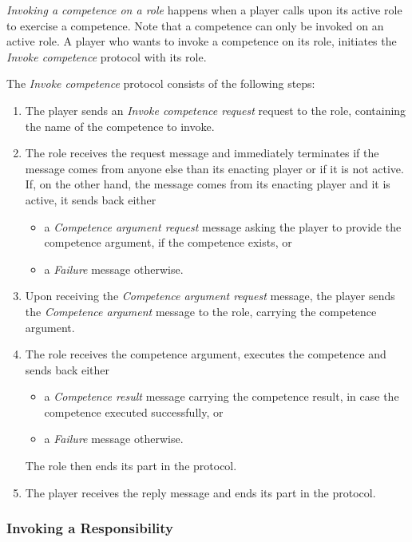 \textit{Invoking a competence on a role} happens when a player calls upon its active role to exercise a competence.
Note that a competence can only be invoked on an active role.
A player who wants to invoke a competence on its role, initiates the \textit{Invoke competence} protocol with its role.

The \textit{Invoke competence} protocol consists of the following steps:
\begin{enumerate}
	\item The player sends an \textit{Invoke competence request} request to the role, containing the name of the competence to invoke.
	\item The role receives the request message and immediately terminates if the message comes from anyone else than its enacting player or if it is not active.
	If, on the other hand, the message comes from its enacting player and it is active, it sends back either
	\begin{itemize}
		\item a \textit{Competence argument request} message asking the player to provide the competence argument, if the competence exists, or
		\item a \textit{Failure} message otherwise.
	\end{itemize}
	\item Upon receiving the \textit{Competence argument request} message, the player sends the \textit{Competence argument} message to the role, carrying the competence argument.
	\item The role receives the competence argument, executes the competence and sends back either
	\begin{itemize}
		\item a \textit{Competence result} message carrying the competence result, in case the competence executed successfully, or
		\item a \textit{Failure} message otherwise.
	\end{itemize}
	The role then ends its part in the protocol.
	\item The player receives the reply message and ends its part in the protocol.
\end{enumerate}

\subsubsection{Invoking a Responsibility}

